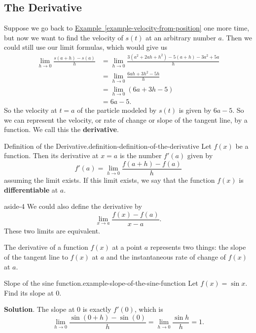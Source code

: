 \documentclass[10pt,]{book}
\newcommand{\terminology}[1]{\textbf{#1}}
\numberwithin{equation}{section}
\begin{document}
\subsection[{The Derivative}]{The Derivative}\label{subsection-the-derivative}
\hypertarget{p-91}{}%
Suppose we go back to \hyperref[example-velocity-from-position]{Example~\ref{example-velocity-from-position}} one more time, but now we want to find the velocity of \(s(t)\) at an arbitrary number \(a\). Then we could still use our limit formulas, which would give us%
%
\begin{align*}
\lim_{h\to0}\frac{s(a+h)-s(a)}{h} & = \lim_{h\to0}\frac{3(a^{2}+2ah+h^{2})-5(a+h) - 3a^{2} + 5a}{h} \\
& = \lim_{h\to0}\frac{6ah+3h^{2} - 5h}{h} \\
& = \lim_{h\to0}(6a+3h-5) \\
& = 6a-5. 
\end{align*}
\hypertarget{p-92}{}%
So the velocity at \(t=a\) of the particle modeled by \(s(t)\) is given by \(6a-5\). So we can represent the velocity, or rate of change or slope of the tangent line, by a function. We call this the \terminology{derivative}.%
\begin{definition}{Definition of the Derivative.}{definition-definition-of-the-derivative}%
\hypertarget{p-93}{}%
Let \(f(x)\) be a function. Then its derivative at \(x=a\) is the number \(f'(a)\) given by%
\begin{equation*}
f'(a) = \lim_{h\to0}\frac{f(a+h)-f(a)}{h}
\end{equation*}
assuming the limit exists. If this limit exists, we say that the function \(f(x)\) is \terminology{differentiable} at \(a\).%
\end{definition}
\begin{aside}{}{aside-4}%
\hypertarget{p-94}{}%
We could also define the derivative by%
\begin{equation*}
\lim_{x\to a}\frac{f(x)-f(a)}{x-a}.
\end{equation*}
These two limits are equivalent.%
\end{aside}
\hypertarget{p-95}{}%
The derivative of a function \(f(x)\) at a point \(a\) represents two things: the slope of the tangent line to \(f(x)\) at \(a\) and the instantaneous rate of change of \(f(x)\) at \(a\).%
\begin{example}{Slope of the sine function.}{example-slope-of-the-sine-function}%
\hypertarget{p-96}{}%
Let \(f(x) = \sin x\). Find its slope at \(0\).%
\par\smallskip%
\noindent\textbf{Solution}.\hypertarget{solution-20}{}\quad%
\hypertarget{p-97}{}%
The slope at \(0\) is exactly \(f'(0)\), which is%
\begin{equation*}
\lim_{h\to0}\frac{\sin(0+h)-\sin(0)}{h} = \lim_{h\to0}\frac{\sin h}{h} = 1.
\end{equation*}
%
\end{example}
\end{document}
